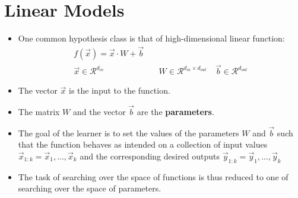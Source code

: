 \section{Linear Models}

\begin{itemize}
\item One common hypothesis class is that of high-dimensional linear function:
\begin{equation}
\begin{split}
f(\vec{x}) = \vec{x} \cdot W + \vec{b}\\
\vec{x} \in  \mathcal{R}^{d_{in}} & \quad W \in  \mathcal{R}^{d_{in}\times d_{out}} \quad \vec{b} \in  \mathcal{R}^{d_{out}}
\end{split}
\end{equation}
\item The vector $\vec{x}$ is the input to the function.
\item The matrix $W$ and the vector $\vec{b}$ are the \textbf{parameters}.

\item The goal of the learner is to set the values of the parameters $W$ and $\vec{b}$ such that the function behaves as intended on a collection of input values $\vec{x}_{1:k} = \vec{x}_1,\dots,\vec{x}_k$ and the corresponding desired outputs $\vec{y}_{1:k} = \vec{y}_1,\dots,\vec{y}_k$

\item The task of searching over the space of functions is thus reduced to one of searching over the space of parameters. \cite{goldberg2017neural}

\end{itemize}


